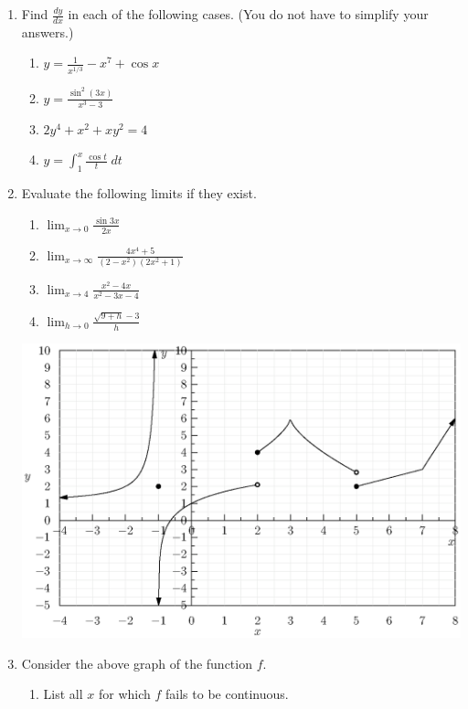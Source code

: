 \documentclass[12pt]{article}
\newcommand{\ds}{\displaystyle}
\begin{document}
\begin{enumerate}
\item Find
  $\ds\frac{dy}{dx}$ in each of the following cases.  (You do not have to
  simplify your answers.)
  \begin{enumerate}
  \item $\ds y=\frac{1}{x^{1/3}} - x^7 + \cos x$
\vfill
  \item $\ds y=\frac{\sin^2(3x)}{x^3-3}$
\vfill
  \item $\ds 2y^4 + x^2 + xy^2 = 4$
\vfill
  \item $\ds y=\int_1^x \frac{\cos t}{t} \; dt$
\vfill
  \end{enumerate}
\newpage
\item Evaluate
  the following limits if they exist.
  \begin{enumerate}
  \item $\ds \lim_{x\to 0} 
    \frac{\sin 3x}{2x}$
\vfill
  \item $\ds \lim_{x\to\infty} \frac{4x^4+5}{(2-x^2)(2x^2+1)}$
\vfill
  \item $\ds \lim_{x\to 4} \frac{x^2-4x}{x^2-3x-4}$
\vfill
  \item $\ds \lim_{h\to 0} \frac{\sqrt{9+h}-3}{h}$
\vfill
  \end{enumerate}
\newpage
  \begin{center}
    \includegraphics[width=6in]{grph.eps}%
  \end{center}
\item Consider 
  the above graph of the function $f$.
  \begin{enumerate}
  \item List all $x$ for which $f$ fails to be continuous.

\end{enumerate}
\end{enumerate}
\end{document}
